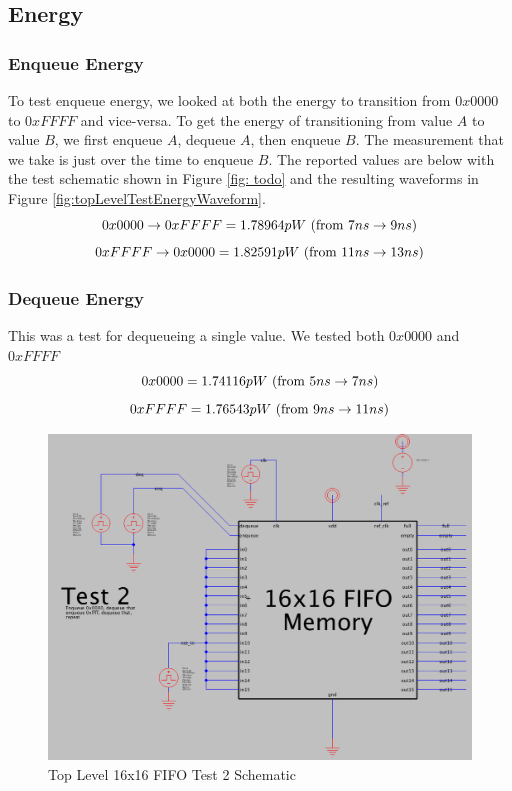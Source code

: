 \documentclass[a4paper]{article}
\begin{document}
\subsection{Energy}
\subsubsection{Enqueue Energy}
To test enqueue energy, we looked at both the energy to transition from $0x0000$ to $0xFFFF$ and vice-versa. To get the energy of transitioning from value $A$ to value $B$, we first enqueue $A$, dequeue $A$, then enqueue $B$. The measurement that we take is just over the time to enqueue $B$. The reported values are below with the test schematic shown in Figure \ref{fig: todo} and the resulting waveforms in Figure \ref{fig:topLevelTestEnergyWaveform}.
$$0x0000 \rightarrow 0xFFFF = 1.78964pW\textnormal{ (from $7ns \rightarrow 9ns$)}$$
$$0xFFFF \rightarrow 0x0000 = 1.82591pW\textnormal{ (from $11ns \rightarrow 13ns$)}$$
\subsubsection{Dequeue Energy}
This was a test for dequeueing a single value. We tested both $0x0000$ and $0xFFFF$
$$0x0000 = 1.74116pW\textnormal{ (from $5ns \rightarrow 7ns$)}$$
$$0xFFFF = 1.76543pW\textnormal{ (from $9ns \rightarrow 11ns$)}$$

\begin{figure}[H]
	\centering
	\includegraphics[scale=0.2]{topLevelTest2Schematic}
	\caption{Top Level 16x16 FIFO Test 2 Schematic}
	\label{fig:topLevelTest2Schematic}
\end{figure}
\end{document}
